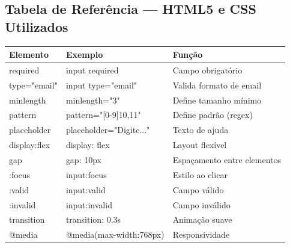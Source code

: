 \documentclass[12pt,a4paper]{article}
\begin{document}

\subsection{Tabela de Referência — HTML5 e CSS Utilizados}

\begin{boxTabela}
\begin{tabular}{|p{4cm}|p{6cm}|p{6cm}|}
\hline
\rowcolor{pretoTabela}
\color{white}\textbf{Elemento} &
\color{white}\textbf{Exemplo} &
\color{white}\textbf{Função} \\
\hline

required & input required & Campo obrigatório \\
\hline

type="email" & input type="email" & Valida formato de email \\
\hline

minlength & minlength="3" & Define tamanho mínimo \\
\hline

pattern & pattern="[0-9]{10,11}" & Define padrão (regex) \\
\hline

placeholder & placeholder="Digite..." & Texto de ajuda \\
\hline

display:flex & display: flex & Layout flexível \\
\hline

gap & gap: 10px & Espaçamento entre elementos \\
\hline

:focus & input:focus & Estilo ao clicar \\
\hline

:valid & input:valid & Campo válido \\
\hline

:invalid & input:invalid & Campo inválido \\
\hline

transition & transition: 0.3s & Animação suave \\
\hline

@media & @media(max-width:768px) & Responsividade \\
\hline

\end{tabular}
\end{boxTabela}
\end{document}
